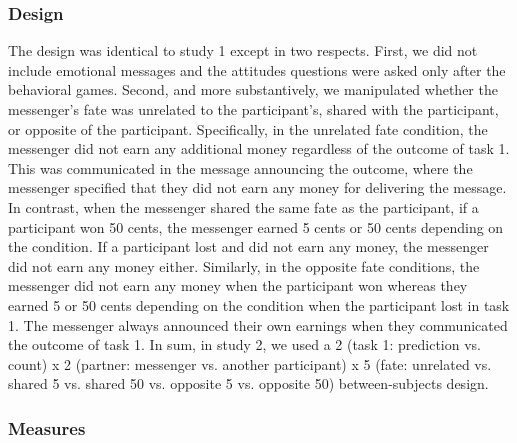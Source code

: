 \subsubsection{Design}

The design was identical to study 1 except in two respects. First, we
did not include emotional messages and the attitudes questions were
asked only after the behavioral games. Second, and more substantively,
we manipulated whether the messenger's fate was unrelated to the
participant's, shared with the participant, or opposite of the
participant. Specifically, in the unrelated fate condition, the
messenger did not earn any additional money regardless of the outcome of
task 1. This was communicated in the message announcing the outcome,
where the messenger specified that they did not earn any money for
delivering the message. In contrast, when the messenger shared the same
fate as the participant, if a participant won 50 cents, the messenger
earned 5 cents or 50 cents depending on the condition. If a participant
lost and did not earn any money, the messenger did not earn any money
either. Similarly, in the opposite fate conditions, the messenger did
not earn any money when the participant won whereas they earned 5 or 50
cents depending on the condition when the participant lost in task 1. 
The messenger always announced their own earnings when they communicated
the outcome of task 1. In sum, in study 2, we used a 2 (task 1:
prediction vs. count) x 2 (partner: messenger vs. another participant) x
5 (fate: unrelated vs. shared 5 vs. shared 50 vs. opposite 5 vs.
opposite 50) between-subjects design.

\subsubsection{Measures}

